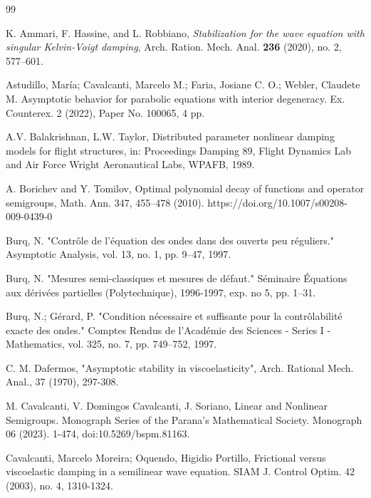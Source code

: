 \documentclass[11pt,reqno]{amsart}
\theoremstyle{remark}
\begin{document}
\begin{thebibliography}{99}

K. Ammari, F. Hassine, and L. Robbiano,
\textit{Stabilization for the wave equation with singular Kelvin-Voigt damping},
Arch. Ration. Mech. Anal. \textbf{236} (2020), no. 2, 577--601.

 Astudillo, María; Cavalcanti, Marcelo M.; Faria, Josiane C. O.; Webler, Claudete M.  Asymptotic behavior for parabolic equations with interior degeneracy. Ex. Counterex. 2 (2022), Paper No. 100065, 4 pp.

 A.V. Balakrishnan, L.W. Taylor, Distributed parameter nonlinear damping models for flight structures, in: Proceedings Damping 89, Flight Dynamics Lab and Air Force Wright Aeronautical Labs, WPAFB, 1989.

 A. Borichev and Y. Tomilov, Optimal polynomial decay of functions and operator semigroups, Math. Ann. 347, 455–478 (2010). https://doi.org/10.1007/s00208-009-0439-0

 Burq, N. "Contrôle de l'équation des ondes dans des ouverts peu réguliers." Asymptotic Analysis, vol. 13, no. 1, pp. 9–47, 1997.

 Burq, N. "Mesures semi-classiques et mesures de défaut." Séminaire Équations aux dérivées partielles (Polytechnique), 1996-1997, exp. no 5, pp. 1–31.

 Burq, N.; Gérard, P. "Condition n\'ecessaire et suffisante pour la contr\^olabilité exacte des ondes." Comptes Rendus de l'Acad\'emie des Sciences - Series I - Mathematics, vol. 325, no. 7, pp. 749–752, 1997.

 C. M. Dafermos, "Asymptotic stability in viscoelasticity", Arch. Rational Mech. Anal., 37 (1970), 297-308.


 M. Cavalcanti, V. Domingos Cavalcanti, J. Soriano, Linear and Nonlinear Semigroups. Monograph Series of the Parana’s Mathematical Society. Monograph 06 (2023). 1-474, doi:10.5269/bspm.81163.

 Cavalcanti, Marcelo Moreira; Oquendo, Higidio Portillo, Frictional versus viscoelastic damping in a semilinear wave equation. SIAM J. Control Optim. 42 (2003), no. 4, 1310-1324.



\end{thebibliography}
\end{document}
